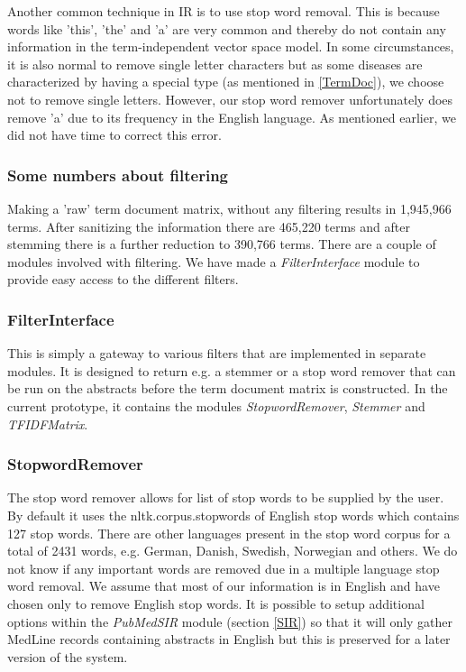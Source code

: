 Another common technique in IR is to use stop word removal. This is
because words like 'this', 'the' and 'a' are very common and thereby
do not contain any information in the term-independent vector space
model. In some circumstances, it is also normal to remove single letter
characters but as some diseases are characterized by having a special
type (as mentioned in \ref{TermDoc}), we choose not to remove single
letters. However, our stop word remover unfortunately does remove 'a'
due to its frequency in the English language. As mentioned earlier, we
did not have time to correct this error.

\subsubsection{Some numbers about filtering}
Making a 'raw' term document matrix, without any filtering results in
1,945,966 terms. After sanitizing the information there are 465,220 terms 
and after stemming there is a further reduction to 390,766 terms.
There are a couple of modules involved with filtering. We have made a
\textit{FilterInterface} module to provide easy access to the different
filters.

\subsubsection{FilterInterface}
This is simply a gateway to various filters that are implemented in
separate modules. It is designed to return e.g. a stemmer or a stop
word remover that can be run on the abstracts before the term document
matrix is constructed. In the current prototype, it contains the
modules \textit{StopwordRemover}, \textit{Stemmer} and
\textit{TFIDFMatrix}.

\subsubsection{StopwordRemover}
The stop word remover allows for list of stop words to be supplied by
the user. By default it uses the nltk.corpus.stopwords of English stop
words which contains 127 stop words. There are other languages present
in the stop word corpus for a total of 2431 words, e.g. German,
Danish, Swedish, Norwegian and others. We do not know if any important
words are removed due in a multiple language stop word removal. We
assume that most of our information is in English and have chosen only
to remove English stop words. It is possible to setup additional
options within the \textit{PubMedSIR} module (section \ref{SIR}) so
that it will only gather MedLine records containing abstracts in
English but this is preserved for a later version of the system.

